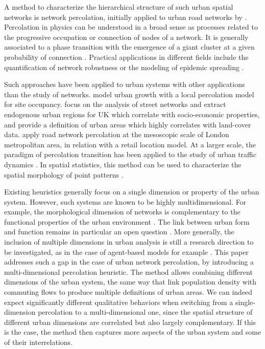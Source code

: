 \documentclass{jimis-en}
\begin{document}
A method to characterize the hierarchical structure of such urban spatial networks is network percolation, initially applied to urban road networks by \cite{arcaute2016cities}. Percolation in physics can be understood in a broad sense as processes related to the progressive occupation or connection of nodes of a network. It is generally associated to a phase transition with the emergence of a giant cluster at a given probability of connection \citep{stauffer2014introduction}. Practical applications in different fields include the quantification of network robustness \citep{callaway2000network} or the modeling of epidemic spreading \citep{newman1999scaling}.

Such approaches have been applied to urban systems with other applications than the study of networks. \cite{makse1998modeling} model urban growth with a local percolation model for site occupancy. \cite{arcaute2016cities} focus on the analysis of street networks and extract endogenous urban regions for UK which correlate with socio-economic properties, and provide a definition of urban areas which highly correlates with land-cover data. \cite{piovani2017urban} apply road network percolation at the mesoscopic scale of London metropolitan area, in relation with a retail location model. At a larger scale, the paradigm of percolation transition has been applied to the study of urban traffic dynamics \citep{Li669,Zeng23}. In spatial statistics, this method can be used to characterize the spatial morphology of point patterns \citep{huynh2018characterisation}.


Existing heuristics generally focus on a single dimension or property of the urban system. However, such systems are known to be highly multidimensional. For example, the morphological dimension of networks is complementary to the functional properties of the urban environment \citep{burger2012form}. The link between urban form and function remains in particular an open question \citep{batty1994fractal}. More generally, the inclusion of multiple dimensions in urban analysis is still a research direction to be investigated, as in the case of agent-based models for example \citep{perez2016agent}. This paper addresses such a gap in the case of urban network percolation, by introducing a multi-dimensional percolation heuristic. The method allows combining different dimensions of the urban system, the same way that \cite{cottineau2018defining} link population density with commuting flows to produce multiple definitions of urban areas. We can indeed expect significantly different qualitative behaviors when switching from a single-dimension percolation to a multi-dimensional one, since the spatial structure of different urban dimensions are correlated but also largely complementary. If this is the case, the method then captures more aspects of the urban system and some of their interrelations.
\end{document}
